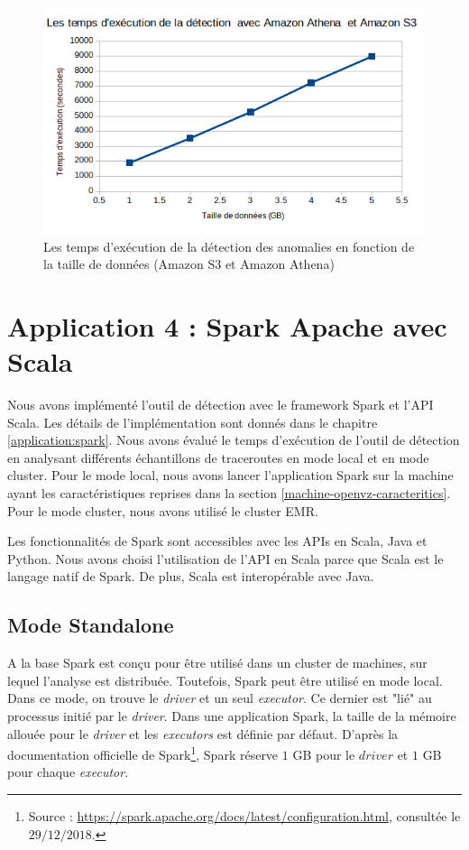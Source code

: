 \begin{figure}[H]
	\centering
	\captionsetup{justification=centering}
	\includegraphics[width=0.7\linewidth]{illustrations/temps-avec-aws_1}
	\caption{Les temps d'exécution de la détection des anomalies en fonction de la taille de données (Amazon S3 et Amazon Athena)}
	\label{fig:temps-avec-aws}
\end{figure}


\section{Application 4 : Spark Apache avec Scala}
Nous avons implémenté l'outil de détection avec le framework Spark et l'API Scala. Les détails de l'implémentation sont donnés dans le chapitre \ref{application:spark}.  Nous avons évalué le temps d'exécution de l'outil de détection en analysant différents échantillons de traceroutes  en mode local et en mode cluster. Pour le mode local, nous avons lancer l'application Spark sur la machine ayant les caractéristiques  reprises dans la section \ref{machine-openvz-caracteritics}. Pour le mode cluster, nous avons utilisé le cluster EMR.

Les fonctionnalités de Spark sont accessibles avec les  APIs en Scala, Java et Python. Nous avons choisi l'utilisation de l'API en Scala parce que Scala est le langage natif de Spark. De plus, Scala est interopérable avec Java. 

\subsection{Mode Standalone}

A la base Spark est conçu pour être utilisé dans un cluster de machines, sur  lequel l'analyse est distribuée. Toutefois, Spark peut être utilisé en mode local. Dans ce mode, on trouve le \textit{driver} et un seul \textit{executor}. Ce dernier est "lié" au processus initié par le \textit{driver}. 
Dans une application Spark, la taille de la mémoire allouée pour le \textit{driver} et les \textit{executors} est  définie par défaut. D'après la documentation officielle de Spark\footnote{Source : \url{https://spark.apache.org/docs/latest/configuration.html}, consultée le $29/12/2018$.}, Spark réserve $ 1 $ GB pour le $ driver $ et $ 1 $ GB pour chaque \textit{executor}. 




